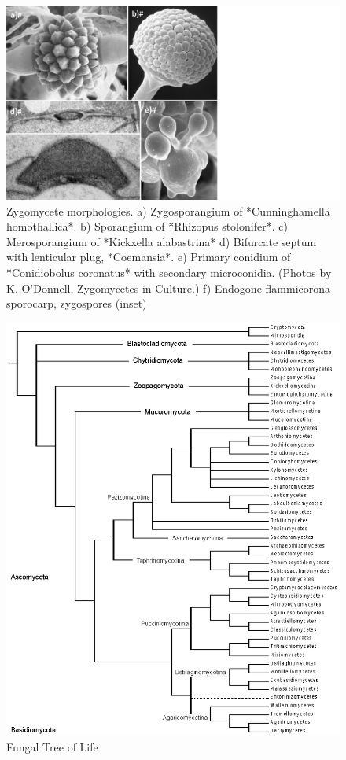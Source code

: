 \documentclass[]{book}
\begin{document}
\begin{figure}

{\centering \includegraphics[width=17.49in]{img/Fig1_Ch1} 

}

\caption{Zygomycete morphologies. a) Zygosporangium of *Cunninghamella homothallica*. b) Sporangium of *Rhizopus stolonifer*. c) Merosporangium of *Kickxella alabastrina* d) Bifurcate septum with lenticular plug, *Coemansia*. e) Primary conidium of *Conidiobolus coronatus* with secondary microconidia. (Photos by K. O’Donnell, Zygomycetes in Culture.) f) Endogone flammicorona sporocarp, zygospores (inset)}\label{fig:zygomorph}
\end{figure}

\begin{figure}

{\centering \includegraphics[width=11.97in]{img/Fig2_Ch1} 

}

\caption{Fungal Tree of Life}\label{fig:ftol}
\end{figure}
\end{document}

